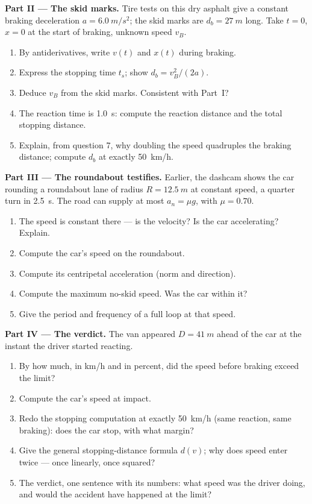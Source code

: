 \begin{problem}
\medskip
\noindent\textbf{Part II --- The skid marks.}
Tire tests on this dry asphalt give a constant braking deceleration
$a = \qty{6.0}{m/s^2}$; the skid marks are $d_b = \qty{27}{m}$ long.
Take $t = 0$, $x = 0$ at the start of braking, unknown speed $v_B$.
\begin{enumerate}[resume]
  \item By antiderivatives, write $v(t)$ and $x(t)$ during braking.
  \item Express the stopping time $t_s$; show $d_b = v_B^2/(2a)$.
  \item Deduce $v_B$ from the skid marks. Consistent with Part~I?
  \item The reaction time is \qty{1.0}{s}: compute the reaction
        distance and the total stopping distance.
  \item Explain, from question 7, why doubling the speed quadruples
        the braking distance; compute $d_b$ at exactly \qty{50}{km/h}.
\end{enumerate}

\medskip
\noindent\textbf{Part III --- The roundabout testifies.}
Earlier, the dashcam shows the car rounding a roundabout lane of
radius $R = \qty{12.5}{m}$ at constant speed, a quarter turn in
\qty{2.5}{s}. The road can supply at most $a_n = \mu g$, with
$\mu = 0.70$.
\begin{enumerate}[resume]
  \item The speed is constant there --- is the velocity? Is the car
        accelerating? Explain.
  \item Compute the car's speed on the roundabout.
  \item Compute its centripetal acceleration (norm and direction).
  \item Compute the maximum no-skid speed. Was the car within it?
  \item Give the period and frequency of a full loop at that speed.
\end{enumerate}

\medskip
\noindent\textbf{Part IV --- The verdict.}
The van appeared $D = \qty{41}{m}$ ahead of the car at the instant
the driver started reacting.
\begin{enumerate}[resume]
  \item By how much, in \unit{km/h} and in percent, did the speed
        before braking exceed the limit?
  \item Compute the car's speed at impact.
  \item Redo the stopping computation at exactly \qty{50}{km/h} (same
        reaction, same braking): does the car stop, with what margin?
  \item Give the general stopping-distance formula $d(v)$; why does
        speed enter twice --- once linearly, once squared?
  \item The verdict, one sentence with its numbers: what speed was the
        driver doing, and would the accident have happened at the limit?
\end{enumerate}
\end{problem}

